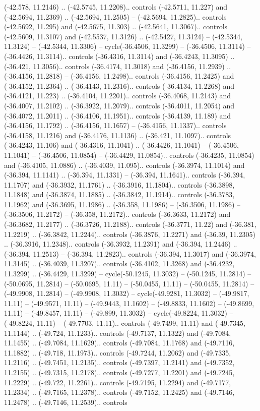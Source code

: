 \begin{scope}[shift={(2.5552, 9.9912)}]
\begin{scope}[shift={(48.1654, -14.8546)}]
(-42.578, 11.2146) .. (-42.5745, 11.2208).. controls (-42.5711, 11.227) and (-42.5694, 11.2369) .. (-42.5694, 11.2505) -- (-42.5694, 11.2825).. controls (-42.5692, 11.295) and (-42.5675, 11.303) .. (-42.5641, 11.3067).. controls (-42.5609, 11.3107) and (-42.5537, 11.3126) .. (-42.5427, 11.3124) -- (-42.5344, 11.3124) -- (-42.5344, 11.3306) -- cycle(-36.4506, 11.3299) -- (-36.4506, 11.3114) -- (-36.4426, 11.3114).. controls (-36.4316, 11.3114) and (-36.4243, 11.3095) .. (-36.421, 11.3056).. controls (-36.4174, 11.3018) and (-36.4156, 11.2939) .. (-36.4156, 11.2818) -- (-36.4156, 11.2498).. controls (-36.4156, 11.2425) and (-36.4152, 11.2364) .. (-36.4143, 11.2316).. controls (-36.4134, 11.2268) and (-36.4121, 11.223) .. (-36.4104, 11.2201).. controls (-36.4068, 11.2143) and (-36.4007, 11.2102) .. (-36.3922, 11.2079).. controls (-36.4011, 11.2054) and (-36.4072, 11.2011) .. (-36.4106, 11.1951).. controls (-36.4139, 11.189) and (-36.4156, 11.1792) .. (-36.4156, 11.1657) -- (-36.4156, 11.1337).. controls (-36.4158, 11.1216) and (-36.4176, 11.1136) .. (-36.421, 11.1097).. controls (-36.4243, 11.106) and (-36.4316, 11.1041) .. (-36.4426, 11.1041) -- (-36.4506, 11.1041) -- (-36.4506, 11.0854) -- (-36.4429, 11.0854).. controls (-36.4235, 11.0854) and (-36.4105, 11.0886) .. (-36.4039, 11.095).. controls (-36.3974, 11.1014) and (-36.394, 11.1141) .. (-36.394, 11.1331) -- (-36.394, 11.1641).. controls (-36.394, 11.1707) and (-36.3932, 11.1761) .. (-36.3916, 11.1804).. controls (-36.3898, 11.1848) and (-36.3874, 11.1885) .. (-36.3842, 11.1914).. controls (-36.3783, 11.1962) and (-36.3695, 11.1986) .. (-36.358, 11.1986) -- (-36.3506, 11.1986) -- (-36.3506, 11.2172) -- (-36.358, 11.2172).. controls (-36.3633, 11.2172) and (-36.3682, 11.2177) .. (-36.3726, 11.2188).. controls (-36.3771, 11.22) and (-36.381, 11.2219) .. (-36.3842, 11.2244).. controls (-36.3876, 11.2271) and (-36.39, 11.2305) .. (-36.3916, 11.2348).. controls (-36.3932, 11.2391) and (-36.394, 11.2446) .. (-36.394, 11.2513) -- (-36.394, 11.2823).. controls (-36.394, 11.3017) and (-36.3974, 11.3145) .. (-36.4039, 11.3207).. controls (-36.4102, 11.3268) and (-36.4232, 11.3299) .. (-36.4429, 11.3299) -- cycle(-50.1245, 11.3032) -- (-50.1245, 11.2814) -- (-50.0695, 11.2814) -- (-50.0695, 11.11) -- (-50.0455, 11.11) -- (-50.0455, 11.2814) -- (-49.9908, 11.2814) -- (-49.9908, 11.3032) -- cycle(-49.9281, 11.3032) -- (-49.9817, 11.11) -- (-49.9571, 11.11) -- (-49.9443, 11.1602) -- (-49.8833, 11.1602) -- (-49.8699, 11.11) -- (-49.8457, 11.11) -- (-49.899, 11.3032) -- cycle(-49.8224, 11.3032) -- (-49.8224, 11.11) -- (-49.7703, 11.11).. controls (-49.7499, 11.11) and (-49.7345, 11.1144) .. (-49.724, 11.1233).. controls (-49.7137, 11.1322) and (-49.7084, 11.1455) .. (-49.7084, 11.1629).. controls (-49.7084, 11.1768) and (-49.7116, 11.1882) .. (-49.718, 11.1973).. controls (-49.7244, 11.2062) and (-49.7335, 11.2116) .. (-49.7451, 11.2135).. controls (-49.7397, 11.2141) and (-49.7352, 11.2155) .. (-49.7315, 11.2178).. controls (-49.7277, 11.2201) and (-49.7245, 11.2229) .. (-49.722, 11.2261).. controls (-49.7195, 11.2294) and (-49.7177, 11.2334) .. (-49.7165, 11.2378).. controls (-49.7152, 11.2425) and (-49.7146, 11.2478) .. (-49.7146, 11.2539).. controls 
\end{scope}
\end{scope}
